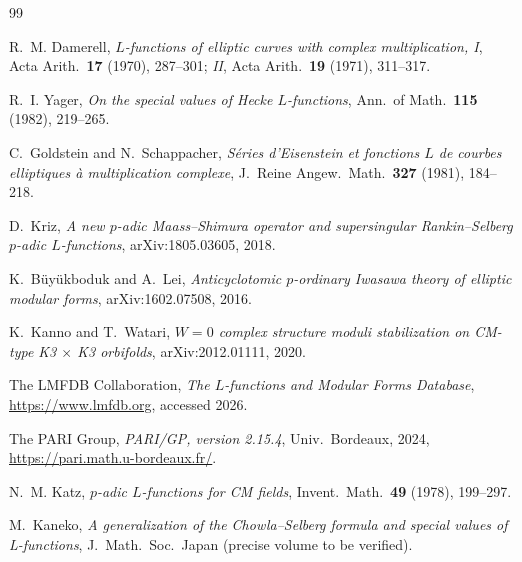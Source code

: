 \documentclass[12pt]{amsart}
\theoremstyle{definition}
\begin{document}
\begin{thebibliography}{99}

  R.~M. Damerell,
  \textit{$L$-functions of elliptic curves with complex multiplication, I},
  Acta Arith.\ \textbf{17} (1970), 287--301; \textit{II}, Acta Arith.\ \textbf{19}
  (1971), 311--317.

  R.~I. Yager,
  \textit{On the special values of Hecke $L$-functions},
  Ann.\ of Math.\ \textbf{115} (1982), 219--265.

  C.~Goldstein and N.~Schappacher,
  \textit{Séries d'Eisenstein et fonctions $L$ de courbes elliptiques à
  multiplication complexe},
  J.\ Reine Angew.\ Math.\ \textbf{327} (1981), 184--218.

  D.~Kriz,
  \textit{A new $p$-adic Maass--Shimura operator and supersingular
  Rankin--Selberg $p$-adic $L$-functions},
  arXiv:1805.03605, 2018.

  K.~Büyükboduk and A.~Lei,
  \textit{Anticyclotomic $p$-ordinary Iwasawa theory of elliptic modular forms},
  arXiv:1602.07508, 2016.

  K.~Kanno and T.~Watari,
  \textit{$W=0$ complex structure moduli stabilization on CM-type
  K3 $\times$ K3 orbifolds},
  arXiv:2012.01111, 2020.

  The LMFDB Collaboration,
  \textit{The $L$-functions and Modular Forms Database},
  \url{https://www.lmfdb.org}, accessed 2026.

  The PARI Group,
  \textit{PARI/GP, version 2.15.4},
  Univ.\ Bordeaux, 2024,
  \url{https://pari.math.u-bordeaux.fr/}.


  N.~M. Katz,
  \textit{$p$-adic $L$-functions for CM fields},
  Invent.\ Math.\ \textbf{49} (1978), 199--297.

  M.~Kaneko,
  \textit{A generalization of the Chowla--Selberg formula
  and special values of L-functions},
  J.\ Math.\ Soc.\ Japan (precise volume to be verified).


\end{thebibliography}
\end{document}
